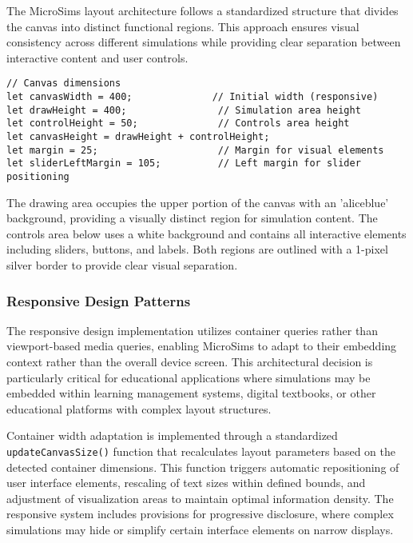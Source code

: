 The MicroSims layout architecture follows a standardized structure that divides the canvas into distinct functional regions. This approach ensures visual consistency across different simulations while providing clear separation between interactive content and user controls.

\begin{lstlisting}[caption={Standard MicroSim Canvas Structure}]
// Canvas dimensions
let canvasWidth = 400;              // Initial width (responsive)
let drawHeight = 400;                // Simulation area height
let controlHeight = 50;              // Controls area height
let canvasHeight = drawHeight + controlHeight;
let margin = 25;                     // Margin for visual elements
let sliderLeftMargin = 105;          // Left margin for slider positioning
\end{lstlisting}

The drawing area occupies the upper portion of the canvas with an 'aliceblue' background, providing a visually distinct region for simulation content. The controls area below uses a white background and contains all interactive elements including sliders, buttons, and labels. Both regions are outlined with a 1-pixel silver border to provide clear visual separation.

\subsubsection{Responsive Design Patterns}

The responsive design implementation utilizes container queries rather than viewport-based media queries, enabling MicroSims to adapt to their embedding context rather than the overall device screen. This architectural decision is particularly critical for educational applications where simulations may be embedded within learning management systems, digital textbooks, or other educational platforms with complex layout structures.

Container width adaptation is implemented through a standardized \texttt{updateCanvasSize()} function that recalculates layout parameters based on the detected container dimensions. This function triggers automatic repositioning of user interface elements, rescaling of text sizes within defined bounds, and adjustment of visualization areas to maintain optimal information density. The responsive system includes provisions for progressive disclosure, where complex simulations may hide or simplify certain interface elements on narrow displays.

